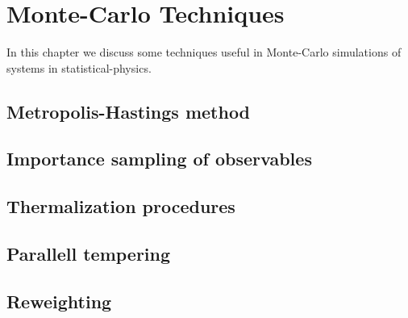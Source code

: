 \chapter{Monte-Carlo Techniques}

In this chapter we discuss some techniques useful in Monte-Carlo simulations
of systems in statistical-physics.

\section{Metropolis-Hastings method}

\section{Importance sampling of observables}

\section{Thermalization procedures}

\section{Parallell tempering}

\section{Reweighting}
